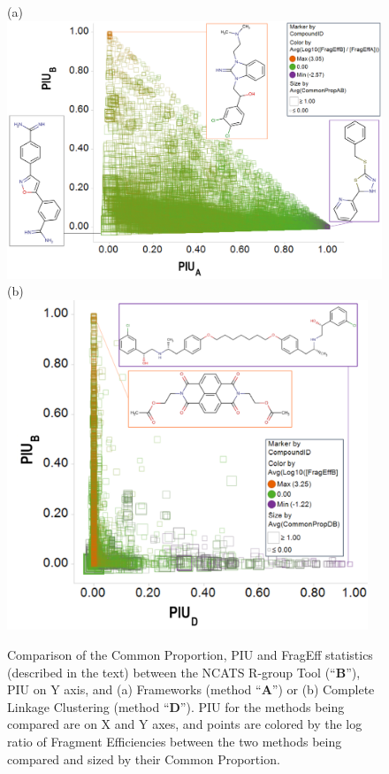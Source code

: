 \documentclass[journal=jacsat,biochem,manuscript=article]{achemso}
\begin{document}
\begin{figure}
(a)\includegraphics[width=5.25in]{fig/statcompare_frames_RGtool_transparent_density_v4.png}
(b)\includegraphics[width=4.25in]{fig/statcompare_CLink_RGtool_transparent_density_v3.png}
  \caption{Comparison of the Common Proportion, PIU and FragEff statistics (described in the text) between the NCATS R-group Tool (``{\bf B}''),
    PIU on Y axis,
    and (a) Frameworks (method ``{\bf A}'')
    or (b) Complete Linkage Clustering (method ``{\bf D}'').
    PIU for the methods being compared are on X and Y axes, and points are 
    colored by the log ratio of Fragment Efficiencies between the two methods being compared and sized by their Common Proportion.}
\label{fig:statcompare}
\end{figure}
\end{document}
